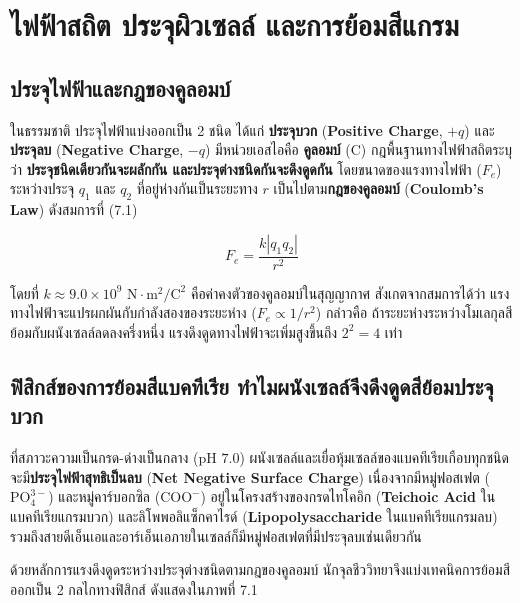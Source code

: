 \chapter{ไฟฟ้าสถิต ประจุผิวเซลล์ และการย้อมสีแกรม}

\section{ประจุไฟฟ้าและกฎของคูลอมบ์}

ในธรรมชาติ ประจุไฟฟ้าแบ่งออกเป็น 2 ชนิด ได้แก่ \textbf{ประจุบวก} (\textbf{Positive Charge}, $+q$) และ\textbf{ประจุลบ} (\textbf{Negative Charge}, $-q$) มีหน่วยเอสไอคือ \textbf{คูลอมบ์} ($\text{C}$) กฎพื้นฐานทางไฟฟ้าสถิตระบุว่า \textbf{ประจุชนิดเดียวกันจะผลักกัน และประจุต่างชนิดกันจะดึงดูดกัน} โดยขนาดของแรงทางไฟฟ้า ($F_e$) ระหว่างประจุ $q_1$ และ $q_2$ ที่อยู่ห่างกันเป็นระยะทาง $r$ เป็นไปตาม\textbf{กฎของคูลอมบ์} (\textbf{Coulomb's Law}) ดังสมการที่ (7.1)

\begin{equation}
    F_e = \frac{k |q_1 q_2|}{r^2}
\end{equation}

โดยที่ $k \approx 9.0 \times 10^9\text{ N}\cdot\text{m}^2/\text{C}^2$ คือค่าคงตัวของคูลอมบ์ในสุญญากาศ สังเกตจากสมการได้ว่า แรงทางไฟฟ้าจะแปรผกผันกับกำลังสองของระยะห่าง ($F_e \propto 1/r^2$) กล่าวคือ ถ้าระยะห่างระหว่างโมเลกุลสีย้อมกับผนังเซลล์ลดลงครึ่งหนึ่ง แรงดึงดูดทางไฟฟ้าจะเพิ่มสูงขึ้นถึง $2^2 = 4$ เท่า

\section{ฟิสิกส์ของการย้อมสีแบคทีเรีย ทำไมผนังเซลล์จึงดึงดูดสีย้อมประจุบวก}

ที่สภาวะความเป็นกรด-ด่างเป็นกลาง ($\text{pH } 7.0$) ผนังเซลล์และเยื่อหุ้มเซลล์ของแบคทีเรียเกือบทุกชนิดจะมี\textbf{ประจุไฟฟ้าสุทธิเป็นลบ} (\textbf{Net Negative Surface Charge}) เนื่องจากมีหมู่ฟอสเฟต ($\text{PO}_4^{3-}$) และหมู่คาร์บอกซิล ($\text{COO}^-$) อยู่ในโครงสร้างของกรดไทโคอิก (\textbf{Teichoic Acid} ในแบคทีเรียแกรมบวก) และลิโพพอลิแซ็กคาไรด์ (\textbf{Lipopolysaccharide} ในแบคทีเรียแกรมลบ) รวมถึงสายดีเอ็นเอและอาร์เอ็นเอภายในเซลล์ก็มีหมู่ฟอสเฟตที่มีประจุลบเช่นเดียวกัน

ด้วยหลักการแรงดึงดูดระหว่างประจุต่างชนิดตามกฎของคูลอมบ์ นักจุลชีววิทยาจึงแบ่งเทคนิคการย้อมสีออกเป็น 2 กลไกทางฟิสิกส์ ดังแสดงใน\mbox{ภาพที่} 7.1

